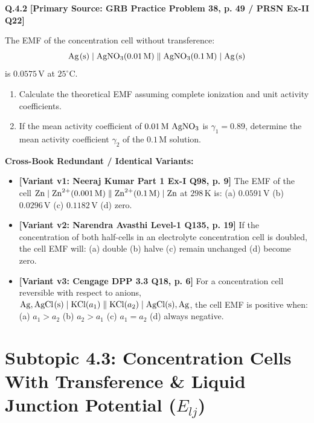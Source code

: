 \begin{problembox}
\textbf{Q.4.2} \hfill \textbf{[Primary Source: GRB Practice Problem 38, p. 49 / PRSN Ex-II Q22]}
\label{q:qb-c4-02}

The EMF of the concentration cell without transference:
\begin{equation*}
    \ce{Ag(s)} \mid \ce{AgNO3}(0.01\,\text{M}) \parallel \ce{AgNO3}(0.1\,\text{M}) \mid \ce{Ag(s)}
\end{equation*}
is $0.0575\,\text{V}$ at $25^\circ\text{C}$.
\begin{enumerate}[label=(\alph*)]
    \item Calculate the theoretical EMF assuming complete ionization and unit activity coefficients.
    \item If the mean activity coefficient of $0.01\,\text{M } \ce{AgNO3}$ is $\gamma_1 = 0.89$, determine the mean activity coefficient $\gamma_2$ of the $0.1\,\text{M}$ solution.
\end{enumerate}

\tcbline
\textbf{\color{accentamber}Cross-Book Redundant / Identical Variants:}
\begin{itemize}[leftmargin=*,itemsep=2pt]
    \item \textbf{[Variant v1: Neeraj Kumar Part 1 Ex-I Q98, p. 9]} The EMF of the cell $\ce{Zn} \mid \ce{Zn^2+}(0.001\,\text{M}) \parallel \ce{Zn^2+}(0.1\,\text{M}) \mid \ce{Zn}$ at $298\,\text{K}$ is: (a) $0.0591\,\text{V}$ (b) $0.0296\,\text{V}$ (c) $0.1182\,\text{V}$ (d) zero.
    \item \textbf{[Variant v2: Narendra Avasthi Level-1 Q135, p. 19]} If the concentration of both half-cells in an electrolyte concentration cell is doubled, the cell EMF will: (a) double (b) halve (c) remain unchanged (d) become zero.
    \item \textbf{[Variant v3: Cengage DPP 3.3 Q18, p. 6]} For a concentration cell reversible with respect to anions, $\ce{Ag, AgCl(s)} \mid \ce{KCl}(a_1) \parallel \ce{KCl}(a_2) \mid \ce{AgCl(s), Ag}$, the cell EMF is positive when: (a) $a_1 > a_2$ (b) $a_2 > a_1$ (c) $a_1 = a_2$ (d) always negative.
\end{itemize}
\end{problembox}

\section{Subtopic 4.3: Concentration Cells With Transference \& Liquid Junction Potential ($E_{lj}$)}


